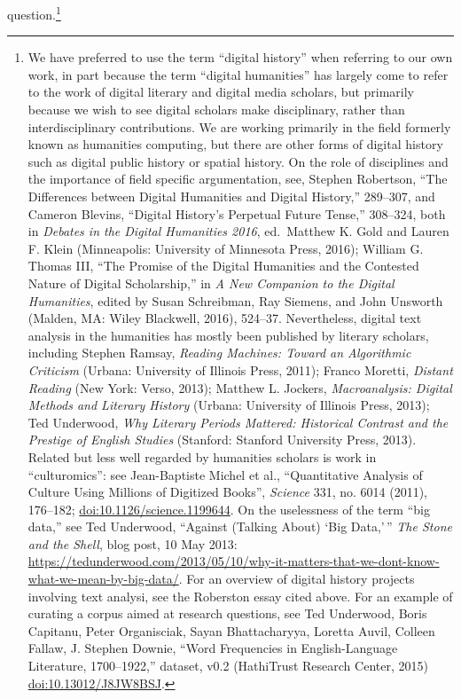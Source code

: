 \documentclass[12pt,]{article}
\let\rmarkdownfootnote\footnote%
\def\footnote{\protect\rmarkdownfootnote}
\begin{document}
question.\footnote{We have preferred to use the term ``digital history''
  when referring to our own work, in part because the term ``digital
  humanities'' has largely come to refer to the work of digital literary
  and digital media scholars, but primarily because we wish to see
  digital scholars make disciplinary, rather than interdisciplinary
  contributions. We are working primarily in the field formerly known as
  humanities computing, but there are other forms of digital history
  such as digital public history or spatial history. On the role of
  disciplines and the importance of field specific argumentation, see,
  Stephen Robertson, ``The Differences between Digital Humanities and
  Digital History,'' 289--307, and Cameron Blevins, ``Digital History's
  Perpetual Future Tense,'' 308--324, both in \emph{Debates in the
  Digital Humanities 2016}, ed.~Matthew K. Gold and Lauren F. Klein
  (Minneapolis: University of Minnesota Press, 2016); William G. Thomas
  III, ``The Promise of the Digital Humanities and the Contested Nature
  of Digital Scholarship,'' in \emph{A New Companion to the Digital
  Humanities}, edited by Susan Schreibman, Ray Siemens, and John
  Unsworth (Malden, MA: Wiley Blackwell, 2016), 524--37. Nevertheless,
  digital text analysis in the humanities has mostly been published by
  literary scholars, including Stephen Ramsay, \emph{Reading Machines:
  Toward an Algorithmic Criticism} (Urbana: University of Illinois
  Press, 2011); Franco Moretti, \emph{Distant Reading} (New York: Verso,
  2013); Matthew L. Jockers, \emph{Macroanalysis: Digital Methods and
  Literary History} (Urbana: University of Illinois Press, 2013); Ted
  Underwood, \emph{Why Literary Periods Mattered: Historical Contrast
  and the Prestige of English Studies} (Stanford: Stanford University
  Press, 2013). Related but less well regarded by humanities scholars is
  work in ``culturomics'': see Jean-Baptiste Michel et al.,
  ``Quantitative Analysis of Culture Using Millions of Digitized
  Books'', \emph{Science} 331, no. 6014 (2011), 176--182;
  \url{doi:10.1126/science.1199644}. On the uselessness of the term
  ``big data,'' see Ted Underwood, ``Against (Talking About) `Big
  Data,'\,'' \emph{The Stone and the Shell}, blog post, 10 May 2013:
  \url{https://tedunderwood.com/2013/05/10/why-it-matters-that-we-dont-know-what-we-mean-by-big-data/}.
  For an overview of digital history projects involving text analysi,
  see the Roberston essay cited above. For an example of curating a
  corpus aimed at research questions, see Ted Underwood, Boris Capitanu,
  Peter Organisciak, Sayan Bhattacharyya, Loretta Auvil, Colleen Fallaw,
  J. Stephen Downie, ``Word Frequencies in English-Language Literature,
  1700--1922,'' dataset, v0.2 (HathiTrust Research Center, 2015)
  \url{doi:10.13012/J8JW8BSJ}.

}
\end{document}
